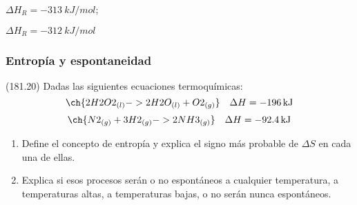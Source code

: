   \begin{solution}
    \begin{enumerate*}
      \item \( \Delta H_R = \SI{-313}{kJ/mol} \);
      \item \( \Delta H_R = \SI{-312}{kJ/mol} \)
    \end{enumerate*}
  \end{solution}






  \subsubsection*{Entropía y espontaneidad}

  \begin{exercise}[
      tags    = {},
      topics  = {química, termodinámica, termoquímica},
      source  = {FQ 1B MGH 2016, p181, e20},
    ]
    (181.20) Dadas las siguientes ecuaciones termoquímicas:
    \[ \ch{2 H2O2_{(l)} -> 2 H2O_{(l)} + O2_{(g)}}\quad\Delta H = \SI{-196}{kJ} \]
    \[ \ch{N2_{(g)} + 3 H2_{(g)} -> 2 NH3 _{(g)}}\quad\Delta H = \SI{-92.4}{kJ} \]

    \begin{enumerate}
      \item Define el concepto de entropía y explica el signo más probable de \( \Delta S \) en cada una de ellas.
      \item Explica si esos procesos serán o no espontáneos a cualquier
      temperatura, a temperaturas altas, a temperaturas bajas, o no serán nunca espontáneos.
    \end{enumerate}
  \end{exercise}

